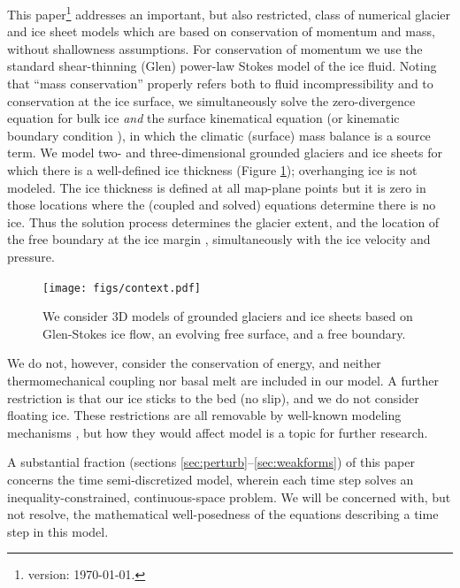 \documentclass[letterpaper,final,12pt,reqno]{amsart}
\begin{document}
This paper\footnote{version: \today.} addresses an important, but also restricted, class of numerical glacier and ice sheet models which are based on conservation of momentum and mass, without shallowness assumptions.  For conservation of momentum we use the standard shear-thinning (Glen) power-law Stokes model of the ice fluid.  Noting that ``mass conservation'' properly refers both to fluid incompressibility and to conservation at the ice surface, we simultaneously solve the zero-divergence equation for bulk ice \emph{and} the surface kinematical equation (or kinematic boundary condition \cite{GreveBlatter2009}), in which the climatic (surface) mass balance is a source term.  We model two- and three-dimensional grounded glaciers and ice sheets for which there is a well-defined ice thickness (Figure \ref{fig:context}); overhanging ice is not modeled.  The ice thickness is defined at all map-plane points but it is zero in those locations where the (coupled and solved) equations determine there is no ice.  Thus the solution process determines the glacier extent, and the location of the free boundary at the ice margin \cite{SchoofHewitt2013}, simultaneously with the ice velocity and pressure.

\begin{figure}[ht]
\begin{center}
\texttt{[image: figs/context.pdf]}
\end{center}
\caption{We consider 3D models of grounded glaciers and ice sheets based on Glen-Stokes ice flow, an evolving free surface, and a free boundary.}
\label{fig:context}
\end{figure}

We do not, however, consider the conservation of energy, and neither thermomechanical coupling nor basal melt are included in our model.  A further restriction is that our ice sticks to the bed (no slip), and we do not consider floating ice.  These restrictions are all removable by well-known modeling mechanisms \cite[for example]{Aschwandenetal2012,Winkelmannetal2011}, but how they would affect model is a topic for further research.

A substantial fraction (sections \ref{sec:perturb}--\ref{sec:weakforms}) of this paper concerns the time semi-discretized model, wherein each time step solves an inequality-constrained, continuous-space problem.  We will be concerned with, but not resolve, the mathematical well-posedness of the equations describing a time step in this model.
\end{document}
